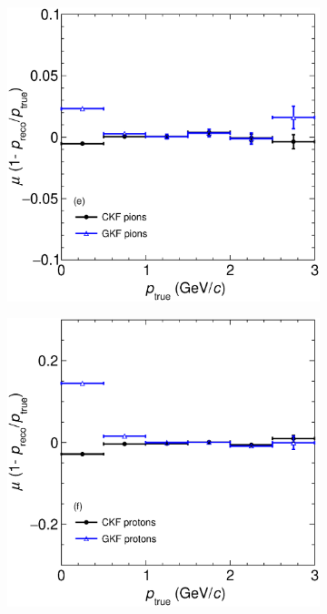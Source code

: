\begin{figure}[t]
\begin{subfigure}{0.32\textwidth}
         \caption{}
         \label{fig:pBiasVSp13_Int}
     \end{subfigure}
     \begin{subfigure}{0.32\textwidth}
         \centering
         \includegraphics[width=\textwidth]{figures/ch5-KF_NDGAr/FullSample/Int/pRes/2D/BiaspVSp_211.eps}
         \caption{}
         \label{fig:pBiasVSp211_Int}
     \end{subfigure}
          \begin{subfigure}{0.32\textwidth}
         \centering
         \includegraphics[width=\textwidth]{figures/ch5-KF_NDGAr/FullSample/Int/pRes/2D/BiaspVSp_2212.eps}

\end{subfigure}
\end{figure}
